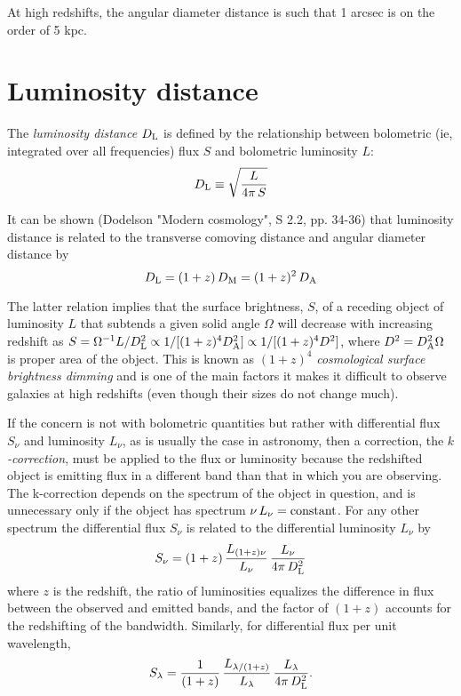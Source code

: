  At high redshifts, the angular diameter
distance is such that 1 arcsec is on the order of 5 kpc.

\section{Luminosity distance}

The {\it luminosity distance} $D_{\rm L}$ is defined by the
relationship between bolometric (ie, integrated over all frequencies)
flux $S$ and bolometric luminosity $L$:
$$
D_{\rm L}\equiv \sqrt{\frac{L}{4\pi\,S}}
$$

It can be shown (Dodelson "Modern cosmology", S 2.2, pp. 34-36) that luminosity distance is related to the transverse comoving distance
and angular diameter distance by
$$
D_{\rm L} = (1+z)\,D_{\rm M} = (1+z)^2\,D_{\rm A}
$$

  The latter
relation implies that the surface brightness, $S$, of a
receding object of luminosity $L$ that subtends a given solid angle $\Omega$ will decrease with increasing redshift as $S=\Omega^{-1} L/D_{\rm L}^2\propto 1/[(1+z)^4D_{\rm A}^2]\propto 1/[(1+z)^4D^2]$, where $D^2=D_{\rm A}^2\Omega$ is proper area of the object. This is known as $(1+z)^4$ {\it cosmological surface brightness dimming\/} and is one of the main factors it makes it difficult to observe galaxies at high redshifts (even though their sizes do not change much). 


If the concern is not with bolometric quantities but rather with
differential flux $S_{\nu}$ and luminosity $L_{\nu}$, as is usually
the case in astronomy, then a correction, the {\it $k$-correction},
must be applied to the flux or luminosity because the redshifted
object is emitting flux in a different band than that in which you are
observing.  The k-correction depends on the spectrum of the object in
question, and is unnecessary only if the object has spectrum
$\nu\,L_{\nu}={\rm constant}$.  For any other spectrum the
differential flux $S_{\nu}$ is related to the differential luminosity
$L_{\nu}$ by
\begin{equation}
S_{\nu} = (1+z)\,\frac{L_{(1+z)\nu}}{L_{\nu}}\,\frac{L_{\nu}}{4\pi\,D_{\rm L}^2}
\end{equation}
where $z$ is the redshift, the ratio of luminosities equalizes the
difference in flux between the observed and emitted bands, and the
factor of $(1+z)$ accounts for the redshifting of the bandwidth.
Similarly, for differential flux per unit wavelength,
\begin{equation}
S_{\lambda} = \frac{1}{(1+z)}\,\frac{L_{\lambda/(1+z)}}{L_{\lambda}}\,
\frac{L_{\lambda}}{4\pi\,D_{\rm L}^2}.
\end{equation}

